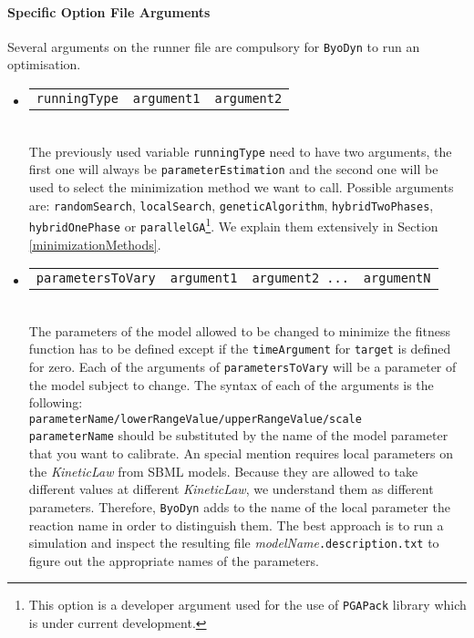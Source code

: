 \documentclass[a4paper, 11pt]{article}
\begin{document}
\paragraph{Specific Option File Arguments} \label{fileArgumentsOptimisation}
Several arguments on the runner file are compulsory for \texttt{ByoDyn} to run an optimisation.
\begin{itemize}
\item \begin{tabular}{ccc}\texttt{runningType}&\texttt{argument1}&\texttt{argument2}\end{tabular}\\[1.5ex]
  The previously used variable \texttt{runningType} need to have two arguments, the first one will always be \texttt{parameterEstimation} and the second one will be used to select the minimization method we want to call. 
  Possible arguments are: \texttt{randomSearch}, \texttt{localSearch}, \texttt{geneticAlgorithm}, \texttt{hybridTwoPhases}, \texttt{hybridOnePhase} or \texttt{parallelGA}\footnote{This option is a developer argument used for the use of \texttt{PGAPack} library which is under current development.}.
  We explain them extensively in Section \ref{minimizationMethods}.
\item \begin{tabular}{cccc}\texttt{parametersToVary}&\texttt{argument1}&\texttt{argument2 ...}&\texttt{argumentN}\end{tabular}\\[1.5ex]
  The parameters of the model allowed to be changed to minimize the fitness function has to be defined except if the \texttt{timeArgument} for \texttt{target} is defined for zero.
  Each of the arguments of \texttt{parametersToVary} will be a parameter of the model subject to change.
  The syntax of each of the arguments is the following:\\[1.5ex]
  \texttt{parameterName/lowerRangeValue/upperRangeValue/scale}\\[1.5ex]
  \texttt{parameterName} should be substituted by the name of the model parameter that you want to calibrate.
  An special mention requires local parameters on the \emph{KineticLaw} from SBML models. 
  Because they are allowed to take different values at different \emph{KineticLaw}, we understand them as different parameters.
  Therefore, \texttt{ByoDyn} adds to the name of the local parameter the reaction name in order to distinguish them. 
  The best approach is to run a simulation and inspect the resulting file \textit{modelName}\texttt{.description.txt} to figure out the appropriate names of the parameters.
  

\end{itemize}
\end{document}
